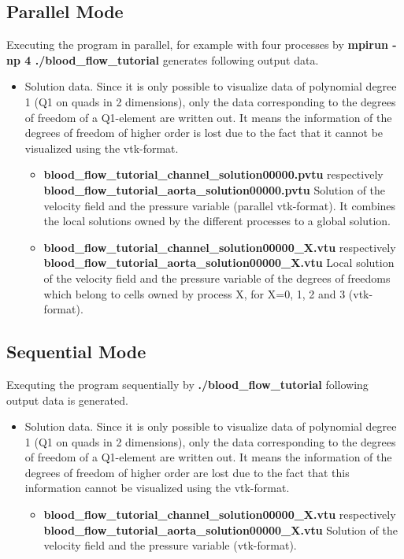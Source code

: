 \documentclass[a4paper, 11pt, twoside]{article}
\begin{document}
\subsection{Parallel Mode}
Executing the program in parallel, for example with four processes by \textbf{mpirun -np 4 ./blood\_flow\_tutorial}   
generates following output data. 
\begin{itemize}
\item Solution data. Since it is only possible to visualize data of polynomial degree 1 (Q1 on quads in 2 dimensions), 
only the data corresponding to the degrees of freedom of a Q1-element are written out. 
It means the information of the degrees of freedom of higher order is lost due to the fact that it cannot be visualized using the vtk-format.
\begin{itemize}
\item \textbf{blood\_flow\_tutorial\_channel\_solution00000.pvtu} respectively\\ \textbf{blood\_flow\_tutorial\_aorta\_solution00000.pvtu} Solution of the velocity field and the pressure variable (parallel vtk-format). It combines the local solutions owned by the different processes to a global solution.
\item \textbf{blood\_flow\_tutorial\_channel\_solution00000\_X.vtu} respectively\\ \textbf{blood\_flow\_tutorial\_aorta\_solution00000\_X.vtu} Local solution of the velocity field and the pressure variable of the degrees of freedoms which belong to cells owned by process X, for X=0, 1, 2 and 3 (vtk-format).
\end{itemize}
\end{itemize}

\subsection{Sequential Mode}
Exequting the program sequentially by \textbf{./blood\_flow\_tutorial} following output data is generated. 
\begin{itemize}
\item Solution data. Since it is only possible to visualize data of polynomial degree 1 (Q1 on quads in 2 dimensions), only the data corresponding to the degrees of freedom of a Q1-element are written out. It means the information of the degrees of freedom of higher order are lost due to the fact that this information cannot be visualized using the vtk-format.
\begin{itemize}
\item \textbf{blood\_flow\_tutorial\_channel\_solution00000\_X.vtu} respectively\\ \textbf{blood\_flow\_tutorial\_aorta\_solution00000\_X.vtu} Solution of the velocity field and the pressure variable (vtk-format). 
\end{itemize}
\end{itemize}
\end{document}
